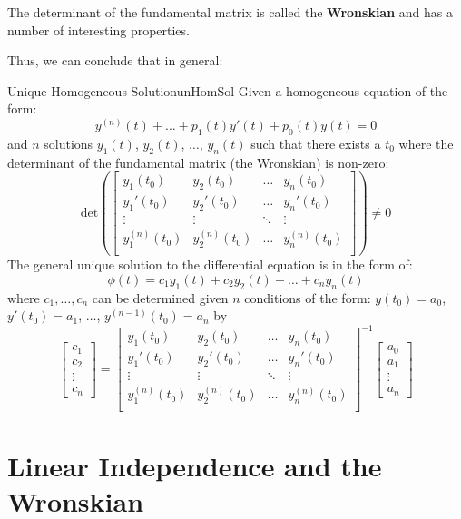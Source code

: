 \documentclass{report}
\begin{document}
The determinant of the fundamental matrix is called the \textbf{Wronskian} and has a number of interesting properties. 

Thus, we can conclude that in general:

\begin{mytheo}{Unique Homogeneous Solution}{unHomSol}
 Given a homogeneous equation of the form:
  $$y^{(n)}(t) + ... + p_1(t)y'(t) + p_0(t)y(t) = 0$$
  and $n$ solutions $y_1(t)$, $y_2(t)$, $\dots$, $y_n(t)$ such that there exists a $t_0$ where the determinant of the fundamental matrix (the Wronskian) is non-zero:
  $$\text{det}\left(\begin{bmatrix}
    y_1(t_0) & y_2(t_0) & \dots  & y_n(t_0) \\
    y_1'(t_0) & y_2'(t_0) & \dots  & y_n'(t_0) \\
    \vdots & \vdots & \ddots & \vdots \\
    y_1^{(n)}(t_0) & y_2^{(n)}(t_0) & \dots  & y_n^{(n)}(t_0) \\
    \end{bmatrix}\right)
    \neq 0
    $$
 The general unique solution to the differential equation is in the form of:
 $$\phi(t) = c_1y_1(t) + c_2y_2(t) + \dots + c_ny_n(t)$$
 where $c_1, \dots, c_n$ can be determined given $n$ conditions of the form:
 $y(t_0) = a_0$, $y'(t_0) = a_1$, $\dots$, $y^{(n-1)}(t_0) = a_n$ by 
 $$
\begin{bmatrix}
    c_1 \\
    c_2 \\
    \vdots \\
    c_n
\end{bmatrix}
=
\begin{bmatrix}
    y_1(t_0) & y_2(t_0) & \dots  & y_n(t_0) \\
    y_1'(t_0) & y_2'(t_0) & \dots  & y_n'(t_0) \\
    \vdots & \vdots & \ddots & \vdots \\
    y_1^{(n)}(t_0) & y_2^{(n)}(t_0) & \dots  & y_n^{(n)}(t_0) \\
    \end{bmatrix}^{-1}
\begin{bmatrix}
    a_0 \\
    a_1 \\
    \vdots \\ 
    a_n
\end{bmatrix}
$$
\end{mytheo}

\section{Linear Independence and the Wronskian}
\end{document}
